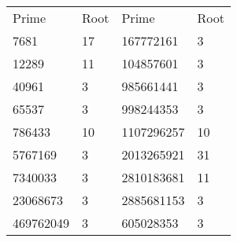 \begin{tabular}{ l l l l }
    Prime & Root & Prime & Root \\
    7681  &   17 & 167772161 & 3 \\
    12289 & 11  &104857601 & 3 \\
    40961 & 3 & 985661441 & 3 \\
    65537 & 3 & 998244353 & 3 \\   
    786433 & 10 & 1107296257 & 10 \\
    5767169 & 3 & 2013265921 & 31 \\
    7340033 & 3 & 2810183681 & 11 \\
    23068673 & 3 & 2885681153 & 3 \\
    469762049 & 3 & 605028353 & 3 
\end{tabular}